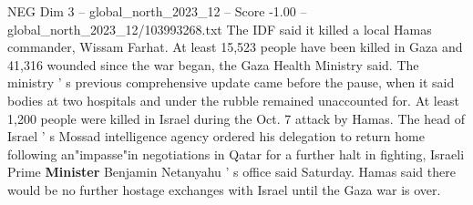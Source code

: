 \begin{textsample}{NEG Dim 3 – global\_north\_2023\_12 – Score -1.00 – global\_north\_2023\_12/103993268.txt}
The IDF said it killed a local Hamas commander, Wissam Farhat.
At least 15,523 people have been killed in Gaza and 41,316 wounded since the war began, the Gaza Health Ministry said.
The ministry ' s previous comprehensive update came before the pause, when it said bodies at two hospitals and under the rubble remained unaccounted for.
At least 1,200 people were killed in Israel during the Oct. 7 attack by Hamas.
The head of Israel ' s Mossad intelligence agency ordered his delegation to return home following an"impasse"in negotiations in Qatar for a further halt in fighting, Israeli Prime \textbf{Minister} Benjamin Netanyahu ' s office said Saturday.
Hamas said there would be no further hostage exchanges with Israel until the Gaza war is over.

\end{textsample}
